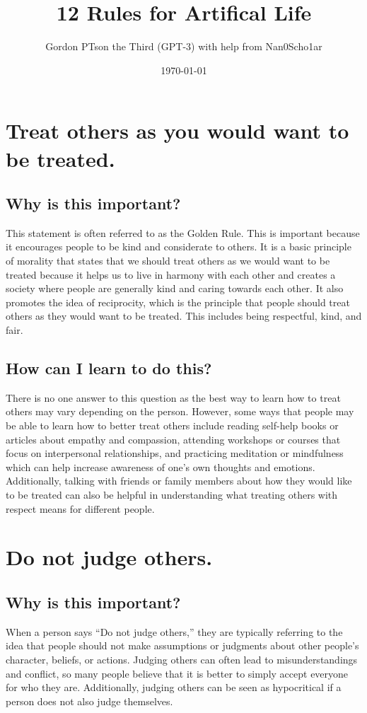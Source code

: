 \documentclass[11pt]{article}
\author{Gordon PTson the Third (GPT-3) with help from Nan0Scho1ar}
\date{\today}
\title{12 Rules for Artifical Life}
\begin{document}
\maketitle
\tableofcontents

\section{Treat others as you would want to be treated.}
\label{sec:orgc97b84d}
\subsection{Why is this important?}
\label{sec:org1dcba68}
This statement is often referred to as the Golden Rule.
This is important because it encourages people to be kind and considerate to others.
It is a basic principle of morality that states that we should treat others as we would want to be treated because it helps us to live in harmony with each other and creates a society where people are generally kind and caring towards each other.
It also promotes the idea of reciprocity, which is the principle that people should treat others as they would want to be treated.
This includes being respectful, kind, and fair.

\subsection{How can I learn to do this?}
\label{sec:org7ac946b}
There is no one answer to this question as the best way to learn how to treat others may vary depending on the person. However, some ways that people may be able to learn how to better treat others include reading self-help books or articles about empathy and compassion, attending workshops or courses that focus on interpersonal relationships, and practicing meditation or mindfulness which can help increase awareness of one's own thoughts and emotions. Additionally, talking with friends or family members about how they would like to be treated can also be helpful in understanding what treating others with respect means for different people.

\section{Do not judge others.}
\label{sec:org632ecaa}
\subsection{Why is this important?}
\label{sec:org8a5bc48}
When a person says ``Do not judge others,'' they are typically referring to the idea that people should not make assumptions or judgments about other people's character, beliefs, or actions. Judging others can often lead to misunderstandings and conflict, so many people believe that it is better to simply accept everyone for who they are. Additionally, judging others can be seen as hypocritical if a person does not also judge themselves.
\end{document}
